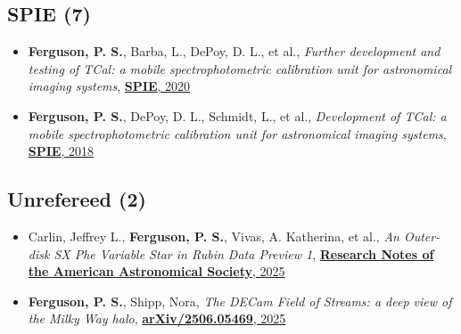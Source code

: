 \subsection{SPIE  (7)}
\begin{itemize}[itemsep=1pt]
    \item \textbf{Ferguson, P. S.}, {Barba}, L., {DePoy}, D. L., et al., \textit{{Further development and testing of TCal: a mobile spectrophotometric calibration unit for astronomical imaging systems}}, \href{https://ui.adsabs.harvard.edu/abs/2020SPIE11447E..5UF}{\textbf{SPIE}, 2020}
    \item \textbf{Ferguson, P. S.}, {DePoy}, D. L., {Schmidt}, L., et al., \textit{{Development of TCal: a mobile spectrophotometric calibration unit for astronomical imaging systems}}, \href{https://ui.adsabs.harvard.edu/abs/2018SPIE10702E..3AF}{\textbf{SPIE}, 2018}
\end{itemize}
\subsection{Unrefereed  (2)}
\begin{itemize}[itemsep=1pt]
    \item {Carlin}, Jeffrey L., \textbf{Ferguson, P. S.}, {Vivas}, A. Katherina, et al., \textit{{An Outer-disk SX Phe Variable Star in Rubin Data Preview 1}}, \href{https://ui.adsabs.harvard.edu/abs/2025RNAAS...9..161C}{\textbf{Research Notes of the American Astronomical Society}, 2025}
    \item \textbf{Ferguson, P. S.}, {Shipp}, Nora, \textit{{The DECam Field of Streams: a deep view of the Milky Way halo}}, \href{https://ui.adsabs.harvard.edu/abs/2025arXiv250605469F}{\textbf{arXiv/2506.05469}, 2025}
\end{itemize}
